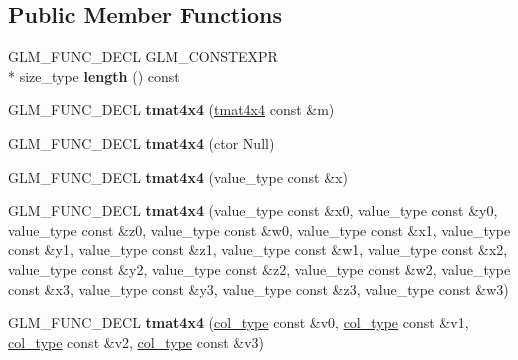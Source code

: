 \subsection*{Public Member Functions}
\begin{DoxyCompactItemize}
\item 
\hypertarget{structglm_1_1detail_1_1tmat4x4_a26c5ad5f614a69c5e33eade3d23c6dac}{G\-L\-M\-\_\-\-F\-U\-N\-C\-\_\-\-D\-E\-C\-L G\-L\-M\-\_\-\-C\-O\-N\-S\-T\-E\-X\-P\-R \\*
size\-\_\-type {\bfseries length} () const }\label{structglm_1_1detail_1_1tmat4x4_a26c5ad5f614a69c5e33eade3d23c6dac}

\item 
\hypertarget{structglm_1_1detail_1_1tmat4x4_a6d8f70d0a928383834eac416dddb1419}{G\-L\-M\-\_\-\-F\-U\-N\-C\-\_\-\-D\-E\-C\-L {\bfseries tmat4x4} (\hyperlink{structglm_1_1detail_1_1tmat4x4}{tmat4x4} const \&m)}\label{structglm_1_1detail_1_1tmat4x4_a6d8f70d0a928383834eac416dddb1419}

\item 
\hypertarget{structglm_1_1detail_1_1tmat4x4_a1e56e9d734ec4d5ea700e93a89d0cbf2}{G\-L\-M\-\_\-\-F\-U\-N\-C\-\_\-\-D\-E\-C\-L {\bfseries tmat4x4} (ctor Null)}\label{structglm_1_1detail_1_1tmat4x4_a1e56e9d734ec4d5ea700e93a89d0cbf2}

\item 
\hypertarget{structglm_1_1detail_1_1tmat4x4_aea89e4fa72c4f04eeffd9613bcc7113f}{G\-L\-M\-\_\-\-F\-U\-N\-C\-\_\-\-D\-E\-C\-L {\bfseries tmat4x4} (value\-\_\-type const \&x)}\label{structglm_1_1detail_1_1tmat4x4_aea89e4fa72c4f04eeffd9613bcc7113f}

\item 
\hypertarget{structglm_1_1detail_1_1tmat4x4_a55026312b4f9e5a8f694b3fae1ea2622}{G\-L\-M\-\_\-\-F\-U\-N\-C\-\_\-\-D\-E\-C\-L {\bfseries tmat4x4} (value\-\_\-type const \&x0, value\-\_\-type const \&y0, value\-\_\-type const \&z0, value\-\_\-type const \&w0, value\-\_\-type const \&x1, value\-\_\-type const \&y1, value\-\_\-type const \&z1, value\-\_\-type const \&w1, value\-\_\-type const \&x2, value\-\_\-type const \&y2, value\-\_\-type const \&z2, value\-\_\-type const \&w2, value\-\_\-type const \&x3, value\-\_\-type const \&y3, value\-\_\-type const \&z3, value\-\_\-type const \&w3)}\label{structglm_1_1detail_1_1tmat4x4_a55026312b4f9e5a8f694b3fae1ea2622}

\item 
\hypertarget{structglm_1_1detail_1_1tmat4x4_a1fdf6c3d8c0427e9f6e62d807ada3f94}{G\-L\-M\-\_\-\-F\-U\-N\-C\-\_\-\-D\-E\-C\-L {\bfseries tmat4x4} (\hyperlink{structglm_1_1detail_1_1tvec4}{col\-\_\-type} const \&v0, \hyperlink{structglm_1_1detail_1_1tvec4}{col\-\_\-type} const \&v1, \hyperlink{structglm_1_1detail_1_1tvec4}{col\-\_\-type} const \&v2, \hyperlink{structglm_1_1detail_1_1tvec4}{col\-\_\-type} const \&v3)}\label{structglm_1_1detail_1_1tmat4x4_a1fdf6c3d8c0427e9f6e62d807ada3f94}


\end{DoxyCompactItemize}
